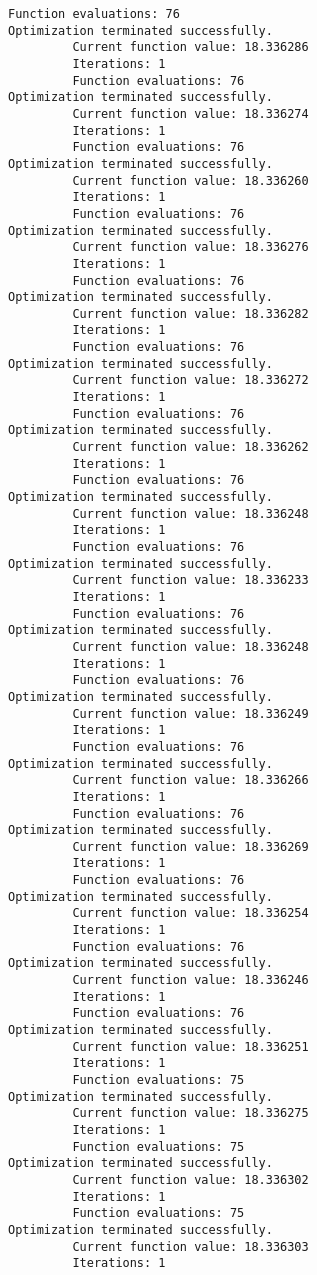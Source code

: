 \documentclass[11pt]{article}
\begin{document}
\begin{Verbatim}[commandchars=\\\{\}]
         Function evaluations: 76
Optimization terminated successfully.
         Current function value: 18.336286
         Iterations: 1
         Function evaluations: 76
Optimization terminated successfully.
         Current function value: 18.336274
         Iterations: 1
         Function evaluations: 76
Optimization terminated successfully.
         Current function value: 18.336260
         Iterations: 1
         Function evaluations: 76
Optimization terminated successfully.
         Current function value: 18.336276
         Iterations: 1
         Function evaluations: 76
Optimization terminated successfully.
         Current function value: 18.336282
         Iterations: 1
         Function evaluations: 76
Optimization terminated successfully.
         Current function value: 18.336272
         Iterations: 1
         Function evaluations: 76
Optimization terminated successfully.
         Current function value: 18.336262
         Iterations: 1
         Function evaluations: 76
Optimization terminated successfully.
         Current function value: 18.336248
         Iterations: 1
         Function evaluations: 76
Optimization terminated successfully.
         Current function value: 18.336233
         Iterations: 1
         Function evaluations: 76
Optimization terminated successfully.
         Current function value: 18.336248
         Iterations: 1
         Function evaluations: 76
Optimization terminated successfully.
         Current function value: 18.336249
         Iterations: 1
         Function evaluations: 76
Optimization terminated successfully.
         Current function value: 18.336266
         Iterations: 1
         Function evaluations: 76
Optimization terminated successfully.
         Current function value: 18.336269
         Iterations: 1
         Function evaluations: 76
Optimization terminated successfully.
         Current function value: 18.336254
         Iterations: 1
         Function evaluations: 76
Optimization terminated successfully.
         Current function value: 18.336246
         Iterations: 1
         Function evaluations: 76
Optimization terminated successfully.
         Current function value: 18.336251
         Iterations: 1
         Function evaluations: 75
Optimization terminated successfully.
         Current function value: 18.336275
         Iterations: 1
         Function evaluations: 75
Optimization terminated successfully.
         Current function value: 18.336302
         Iterations: 1
         Function evaluations: 75
Optimization terminated successfully.
         Current function value: 18.336303
         Iterations: 1

\end{Verbatim}
\end{document}
